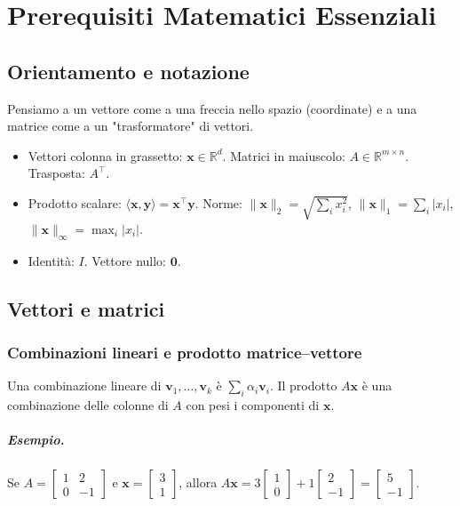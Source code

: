 \chapter{Prerequisiti Matematici Essenziali}\label{ch:prerequisiti}

\section{Orientamento e notazione}\label{sec:notazione}
Pensiamo a un vettore come a una freccia nello spazio (coordinate) e a una matrice come a un "trasformatore" di vettori.
\begin{itemize}
  \item Vettori colonna in grassetto: \(\mathbf{x}\in\mathbb{R}^d\). Matrici in maiuscolo: \(A\in\mathbb{R}^{m\times n}\). Trasposta: \(A^\top\).
  \item Prodotto scalare: \(\langle\mathbf{x},\mathbf{y}\rangle=\mathbf{x}^\top\mathbf{y}\). Norme: \(\|\mathbf{x}\|_2=\sqrt{\sum_i x_i^2}\), \(\|\mathbf{x}\|_1=\sum_i |x_i|\), \(\|\mathbf{x}\|_\infty=\max_i |x_i|\).
  \item Identità: \(I\). Vettore nullo: \(\mathbf{0}\).
\end{itemize}

\section{Vettori e matrici}\label{sec:vett-matr}
\subsection{Combinazioni lineari e prodotto matrice–vettore}
Una combinazione lineare di \(\mathbf{v}_1,\dots,\mathbf{v}_k\) è \(\sum_i \alpha_i\mathbf{v}_i\). Il prodotto \(A\mathbf{x}\) è una combinazione delle colonne di \(A\) con pesi i componenti di \(\mathbf{x}\).
\paragraph{Esempio.} Se \(A=\begin{bmatrix}1&2\\0&-1\end{bmatrix}\) e \(\mathbf{x}=\begin{bmatrix}3\\1\end{bmatrix}\), allora \(A\mathbf{x}=3\begin{bmatrix}1\\0\end{bmatrix}+1\begin{bmatrix}2\\-1\end{bmatrix}=\begin{bmatrix}5\\-1\end{bmatrix}.\)

